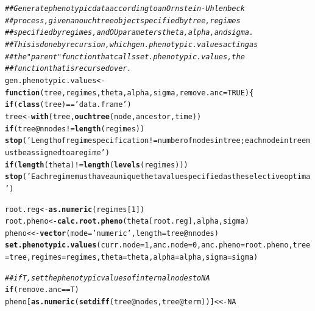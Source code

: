 \documentclass[12pt,reqno,final]{amsart}\usepackage[]{graphicx}\usepackage[]{color}
\makeatletter
\newcommand{\hlnum}[1]{\textcolor[rgb]{0.686,0.059,0.569}{#1}}%
\newcommand{\hlstr}[1]{\textcolor[rgb]{0.192,0.494,0.8}{#1}}%
\newcommand{\hlcom}[1]{\textcolor[rgb]{0.678,0.584,0.686}{\textit{#1}}}%
\newcommand{\hlopt}[1]{\textcolor[rgb]{0,0,0}{#1}}%
\newcommand{\hlstd}[1]{\textcolor[rgb]{0.345,0.345,0.345}{#1}}%
\newcommand{\hlkwa}[1]{\textcolor[rgb]{0.161,0.373,0.58}{\textbf{#1}}}%
\newcommand{\hlkwb}[1]{\textcolor[rgb]{0.69,0.353,0.396}{#1}}%
\newcommand{\hlkwc}[1]{\textcolor[rgb]{0.333,0.667,0.333}{#1}}%
\newcommand{\hlkwd}[1]{\textcolor[rgb]{0.737,0.353,0.396}{\textbf{#1}}}%
\newenvironment{kframe}{%
 \def\at@end@of@kframe{}%
 \ifinner\ifhmode%
  \def\at@end@of@kframe{\end{minipage}}%
  \begin{minipage}{\columnwidth}%
 \fi\fi%
 \def\FrameCommand##1{\hskip\@totalleftmargin \hskip-\fboxsep
 \colorbox{shadecolor}{##1}\hskip-\fboxsep
     \hskip-\linewidth \hskip-\@totalleftmargin \hskip\columnwidth}%
 \MakeFramed {\advance\hsize-\width
   \@totalleftmargin\z@ \linewidth\hsize
   \@setminipage}}%
 {\par\unskip\endMakeFramed%
 \at@end@of@kframe}
\newenvironment{knitrout}{}{} %
\theoremstyle{plain}
\numberwithin{equation}{part}
\makeatother
\begin{document}
\begin{knitrout}
\begin{kframe}
\begin{alltt}
\hlcom{## Generate phenotypic data according to an Ornstein-Uhlenbeck}
\hlcom{## process, given an ouchtree object specified by tree, regimes}
\hlcom{## specified by regimes, and OU parameters theta, alpha, and sigma.}
\hlcom{## This is done by recursion, which gen.phenotypic.values acting as}
\hlcom{## the "parent" function that calls set.phenotypic.values, the}
\hlcom{## function that is recursed over.}
\hlstd{gen.phenotypic.values} \hlkwb{<-} \hlkwa{function}\hlstd{(}\hlkwc{tree}\hlstd{,} \hlkwc{regimes}\hlstd{,} \hlkwc{theta}\hlstd{,} \hlkwc{alpha}\hlstd{,} \hlkwc{sigma}\hlstd{,} \hlkwc{remove.anc}\hlstd{=}\hlnum{TRUE}\hlstd{) \{}
  \hlkwa{if} \hlstd{(}\hlkwd{class}\hlstd{(tree)} \hlopt{==} \hlstr{'data.frame'}\hlstd{)}
    \hlstd{tree} \hlkwb{<-} \hlkwd{with}\hlstd{(tree,} \hlkwd{ouchtree}\hlstd{(node,ancestor,time))}
  \hlkwa{if} \hlstd{(tree}\hlopt{@}\hlkwc{nnodes} \hlopt{!=} \hlkwd{length}\hlstd{(regimes))}
    \hlkwd{stop}\hlstd{(}\hlstr{'Length of regime specification != number of nodes in tree; each node in tree must be assigned to a regime'}\hlstd{)}
  \hlkwa{if} \hlstd{(}\hlkwd{length}\hlstd{(theta)} \hlopt{!=} \hlkwd{length}\hlstd{(}\hlkwd{levels}\hlstd{(regimes)))}
    \hlkwd{stop}\hlstd{(}\hlstr{'Each regime must have a unique theta value specified as the selective optima'}\hlstd{)}

  \hlstd{root.reg} \hlkwb{<-} \hlkwd{as.numeric}\hlstd{(regimes[}\hlnum{1}\hlstd{])}
  \hlstd{root.pheno} \hlkwb{<-} \hlkwd{calc.root.pheno}\hlstd{(theta[root.reg], alpha, sigma)}
  \hlstd{pheno} \hlkwb{<<-} \hlkwd{vector}\hlstd{(}\hlkwc{mode}\hlstd{=}\hlstr{'numeric'}\hlstd{,} \hlkwc{length}\hlstd{=tree}\hlopt{@}\hlkwc{nnodes}\hlstd{)}
  \hlkwd{set.phenotypic.values}\hlstd{(}\hlkwc{curr.node}\hlstd{=}\hlnum{1}\hlstd{,} \hlkwc{anc.node}\hlstd{=}\hlnum{0}\hlstd{,} \hlkwc{anc.pheno}\hlstd{=root.pheno,} \hlkwc{tree}\hlstd{=tree,} \hlkwc{regimes}\hlstd{=regimes,} \hlkwc{theta}\hlstd{=theta,} \hlkwc{alpha}\hlstd{=alpha,} \hlkwc{sigma}\hlstd{=sigma)}

  \hlcom{## if T, set the phenotypic values of internal nodes to NA}
  \hlkwa{if} \hlstd{(remove.anc}\hlopt{==}\hlstd{T)}
    \hlstd{pheno[}\hlkwd{as.numeric}\hlstd{(}\hlkwd{setdiff}\hlstd{(tree}\hlopt{@}\hlkwc{nodes}\hlstd{, tree}\hlopt{@}\hlkwc{term}\hlstd{))]} \hlkwb{<<-} \hlnum{NA}


\end{alltt}
\end{kframe}
\end{knitrout}
\end{document}
